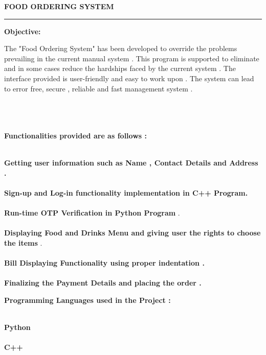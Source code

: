 \documentclass[11pt, a4paper]{article}
\begin{document}
\begin{center}
    \textbf{\Huge{FOOD ORDERING SYSTEM}}
\end{center} 
\hrule
\vspace{1cm}
\begin{left}
    \textbf{\LARGE{Objective:}}
\end{left}
\vspace{0.7cm}


\large{
The "Food Ordering System" has been developed to override the problems prevailing in the current manual system . This program is supported to eliminate and in some cases reduce the hardships faced by the current system . The interface provided is user-friendly and easy to work upon . The system can lead to error free, secure , reliable and fast management system .\\\\\\\\}
\vspace{1.2cm}
\begin{left}
    \textbf{\LARGE{Functionalities provided are as follows :}}
\end{left}
\\
\newline
 \textbullet \textbf{\hspace{1cm} Getting user information such as Name , Contact Details and Address .\\\\}
 \textbullet \textbf{\hspace{1cm}   Sign-up and Log-in functionality implementation in C++ Program.\\\\}
 \textbullet \textbf{\hspace{1cm}  Run-time OTP Verification in Python Program} .\\\\
 \textbullet \textbf{\hspace{1cm}   Displaying Food and Drinks Menu and giving user the rights to choose the items  }.\\\\
 \textbullet \textbf{\hspace{1cm}   Bill Displaying Functionality using proper indentation .\\\\}
 \textbullet \textbf{\hspace{1cm}  Finalizing the Payment Details and placing the order .} 
\\
\vspace{1.2cm}
\newline
\vspace{1.2cm}
\begin{left}
    \textbf{\LARGE{Programming Languages used in the Project :}}
\end{left}
\\
\newline
\textbullet \textbf{\hspace{1cm}Python}\\\\
\textbullet \textbf{\hspace{1cm}C++}
\end{document}
